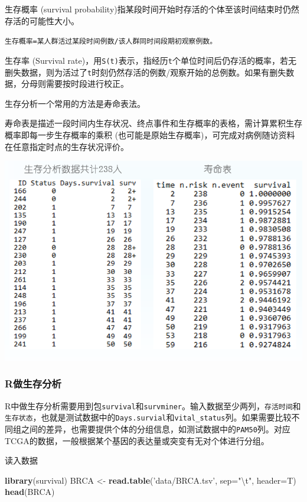 \documentclass[]{article}
\newenvironment{Shaded}{\begin{snugshade}}{\end{snugshade}}
\newcommand{\KeywordTok}[1]{\textcolor[rgb]{0.13,0.29,0.53}{\textbf{{#1}}}}
\newcommand{\DataTypeTok}[1]{\textcolor[rgb]{0.13,0.29,0.53}{{#1}}}
\newcommand{\CharTok}[1]{\textcolor[rgb]{0.31,0.60,0.02}{{#1}}}
\newcommand{\StringTok}[1]{\textcolor[rgb]{0.31,0.60,0.02}{{#1}}}
\newcommand{\NormalTok}[1]{{#1}}
\numberwithin{figure}{section}
\numberwithin{table}{section}
\theoremstyle{definition}
\theoremstyle{definition}
\theoremstyle{definition}
\theoremstyle{remark}
\begin{document}
生存概率 (survival
probability)指某段时间开始时存活的个体至该时间结束时仍然存活的可能性大小。

\texttt{生存概率=某人群活过某段时间例数/该人群同时间段期初观察例数。}

生存率 (Survival
rate)，用\texttt{S(t)}表示，指经历\texttt{t}个单位时间后仍存活的概率，若无删失数据，则为活过了\texttt{t}时刻仍然存活的例数/观察开始的总例数。如果有删失数据，分母则需要按时段进行校正。

生存分析一个常用的方法是寿命表法。

寿命表是描述一段时间内生存状况、终点事件和生存概率的表格，需计算累积生存概率即每一步生存概率的乘积
(也可能是原始生存概率)，可完成对病例随访资料在任意指定时点的生存状况评价。

\begin{center}\includegraphics[width=0.95\linewidth,height=0.7\textheight,keepaspectratio]{images/surv_life_table} \end{center}

\subsubsection{R做生存分析}\label{r}

R中做生存分析需要用到包\texttt{survival}和\texttt{survminer}。输入数据至少两列，\texttt{存活时间}和\texttt{生存状态}，也就是测试数据中的\texttt{Days.survial}和\texttt{vital\_status}列。如果需要比较不同组之间的差异，也需要提供个体的分组信息，如测试数据中的\texttt{PAM50}列。对应TCGA的数据，一般根据某个基因的表达量或突变有无对个体进行分组。

读入数据

\begin{Shaded}
\begin{Highlighting}[]
\KeywordTok{library}\NormalTok{(survival)}
\NormalTok{BRCA <-}\StringTok{ }\KeywordTok{read.table}\NormalTok{(}\StringTok{'data/BRCA.tsv'}\NormalTok{, }\DataTypeTok{sep=}\StringTok{"}\CharTok{\textbackslash{}t}\StringTok{"}\NormalTok{, }\DataTypeTok{header=}\NormalTok{T)}
\KeywordTok{head}\NormalTok{(BRCA)}
\end{Highlighting}
\end{Shaded}
\end{document}
